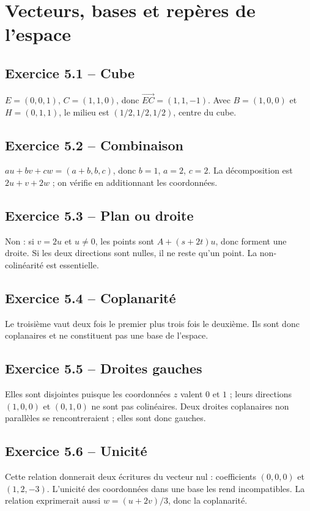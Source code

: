 \chapter{Vecteurs, bases et repères de l’espace}
\section*{Exercice 5.1 -- Cube}
$E=(0,0,1)$, $C=(1,1,0)$, donc $\overrightarrow{EC}=(1,1,-1)$. Avec $B=(1,0,0)$ et $H=(0,1,1)$, le milieu est $(1/2,1/2,1/2)$, centre du cube.

\section*{Exercice 5.2 -- Combinaison}
$au+bv+cw=(a+b,b,c)$, donc $b=1$, $a=2$, $c=2$. La décomposition est $2u+v+2w$ ; on vérifie en additionnant les coordonnées.

\section*{Exercice 5.3 -- Plan ou droite}
Non : si $v=2u$ et $u\ne0$, les points sont $A+(s+2t)u$, donc forment une droite. Si les deux directions sont nulles, il ne reste qu'un point. La non-colinéarité est essentielle.

\section*{Exercice 5.4 -- Coplanarité}
Le troisième vaut deux fois le premier plus trois fois le deuxième. Ils sont donc coplanaires et ne constituent pas une base de l'espace.

\section*{Exercice 5.5 -- Droites gauches}
Elles sont disjointes puisque les coordonnées $z$ valent $0$ et $1$ ; leurs directions $(1,0,0)$ et $(0,1,0)$ ne sont pas colinéaires. Deux droites coplanaires non parallèles se rencontreraient ; elles sont donc gauches.

\section*{Exercice 5.6 -- Unicité}
Cette relation donnerait deux écritures du vecteur nul : coefficients $(0,0,0)$ et $(1,2,-3)$. L'unicité des coordonnées dans une base les rend incompatibles. La relation exprimerait aussi $w=(u+2v)/3$, donc la coplanarité.
